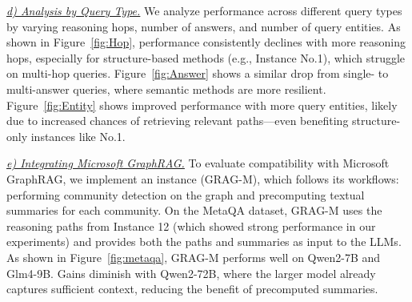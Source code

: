 {\it \underline{d) Analysis by Query Type.}}  
We analyze performance across different query types %
by varying reasoning hops, number of answers, and number of query entities. As shown in Figure~\ref{fig:Hop}, performance consistently declines with more reasoning hops, especially for structure-based methods (e.g., Instance No.1), which struggle on multi-hop queries. 
Figure~\ref{fig:Answer} shows a similar drop from single- to multi-answer queries, where semantic methods are more resilient.
Figure~\ref{fig:Entity} shows improved performance with more query entities, likely due to increased chances of retrieving relevant paths—even benefiting structure-only instances like No.1.

{\it \underline{e) Integrating Microsoft GraphRAG.}} To evaluate compatibility with Microsoft GraphRAG, we implement an instance (GRAG-M), which follows its workflows: performing community detection on the graph and precomputing textual summaries for each community. 
On the MetaQA dataset, GRAG-M uses the reasoning paths from Instance 12 (which showed strong performance in our experiments) and provides both the paths and summaries as input to the LLMs.
As shown in Figure~\ref{fig:metaqa}, GRAG-M performs well on Qwen2-7B and Glm4-9B. Gains diminish with Qwen2-72B, where the larger model already captures sufficient context, reducing the benefit of precomputed summaries. 

